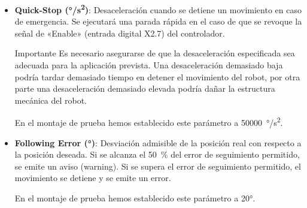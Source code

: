 \documentclass[english,spanish,a4paper,11pt]{article}
\begin{document}
\begin{itemize}
    Si deseamos que un controlador externo (como LinuxCNC) tenga un control total sobre el movimiento del motor estableceremos este parámetro a \qty{0}{\percent}. En este caso, se desactiva cualquier suavizado de transiciones de aceleración y desaceleración dentro del propio controlador del motor, permitiendo que el controlador externo gestione directamente el movimiento.

    Sin embargo, el controlador de movimiento actual de LinuxCNC no dispone de limitación del «jerk», i.e., usa aceleración constante. Podría ser deseable establecer en este parámetro un valor mayor que \qty{0}{\percent} para limitar el «jerk» y evitar vibraciones no deseadas y tensiones en el sistema. Sin embargo, esto tendría la desventaja de aumentar el error de seguimiento dentro de LinuxCNC. Por lo tanto, en caso de querer establecer esta opción a un valor mayor que \qty{0}{\percent} sería importante encontrar un equilibrio entre la suavidad del movimiento y la precisión del seguimiento.

    En nuestro caso hemos establecido el parámetro a \qty{0}{\percent}.
    
    \item \textbf{Quick-Stop (\unit{\degree/\s^2})}: Desaceleración cuando se detiene un movimiento en caso de emergencia. Se ejecutará una parada rápida en el caso de que se revoque la señal de «Enable» (entrada digital X2.7) del controlador.

    \begin{admonition}{Importante}
        Es necesario asegurarse de que la desaceleración especificada sea adecuada para la aplicación prevista. Una desaceleración demasiado baja podría tardar demasiado tiempo en detener el movimiento del robot, por otra parte una desaceleración demasiado elevada podría dañar la estructura mecánica del robot.
    \end{admonition}

    En el montaje de prueba hemos establecido este parámetro a \qty{50000}{\degree/\s^2}.

    \item \textbf{Following Error (\unit{\degree})}: Desviación admisible de la posición real con respecto a la posición deseada. Si se alcanza el \qty{50}{\percent} del error de seguimiento permitido, se emite un aviso (warning). Si se supera el error de seguimiento permitido, el movimiento se detiene y se emite un error.

    En el montaje de prueba hemos establecido este parámetro a \ang{20}.
    

\end{itemize}
\end{document}
